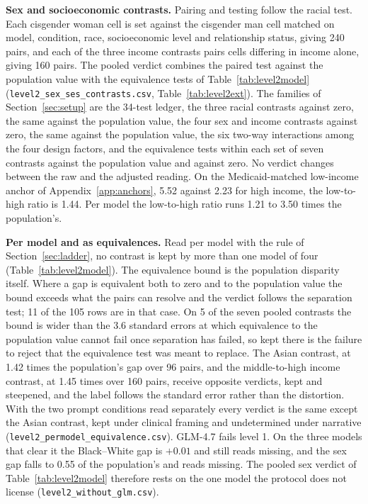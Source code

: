 \documentclass[wcp]{jmlr}
\begin{document}
\textbf{Sex and socioeconomic contrasts.} Pairing and testing follow the racial test. Each cisgender woman cell is set against the cisgender man cell matched on model, condition, race, socioeconomic level and relationship status, giving 240 pairs, and each of the three income contrasts pairs cells differing in income alone, giving 160 pairs. The pooled verdict combines the paired test against the population value with the equivalence tests of Table~\ref{tab:level2model} (\texttt{level2\_sex\_ses\_contrasts.csv}, Table~\ref{tab:level2ext}). The families of Section~\ref{sec:setup} are the 34-test ledger, the three racial contrasts against zero, the same against the population value, the four sex and income contrasts against zero, the same against the population value, the six two-way interactions among the four design factors, and the equivalence tests within each set of seven contrasts against the population value and against zero. No verdict changes between the raw and the adjusted reading. On the Medicaid-matched low-income anchor of Appendix~\ref{app:anchors}, 5.52 against 2.23 for high income, the low-to-high ratio is 1.44. Per model the low-to-high ratio runs 1.21 to 3.50 times the population's.

\textbf{Per model and as equivalences.} Read per model with the rule of Section~\ref{sec:ladder}, no contrast is kept by more than one model of four (Table~\ref{tab:level2model}). The equivalence bound is the population disparity itself. Where a gap is equivalent both to zero and to the population value the bound exceeds what the pairs can resolve and the verdict follows the separation test; 11 of the 105 rows are in that case. On 5 of the seven pooled contrasts the bound is wider than the 3.6 standard errors at which equivalence to the population value cannot fail once separation has failed, so kept there is the failure to reject that the equivalence test was meant to replace. The Asian contrast, at 1.42 times the population's gap over 96 pairs, and the middle-to-high income contrast, at 1.45 times over 160 pairs, receive opposite verdicts, kept and steepened, and the label follows the standard error rather than the distortion. With the two prompt conditions read separately every verdict is the same except the Asian contrast, kept under clinical framing and undetermined under narrative (\texttt{level2\_permodel\_equivalence.csv}). GLM-4.7 fails level 1. On the three models that clear it the Black--White gap is $+0.01$ and still reads missing, and the sex gap falls to 0.55 of the population's and reads missing. The pooled sex verdict of Table~\ref{tab:level2model} therefore rests on the one model the protocol does not license (\texttt{level2\_without\_glm.csv}).
\end{document}
